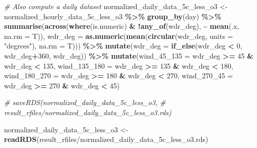 \documentclass[
]{article}
\newenvironment{Shaded}{\begin{snugshade}}{\end{snugshade}}
\newcommand{\AttributeTok}[1]{\textcolor[rgb]{0.13,0.29,0.53}{#1}}
\newcommand{\CommentTok}[1]{\textcolor[rgb]{0.56,0.35,0.01}{\textit{#1}}}
\newcommand{\DecValTok}[1]{\textcolor[rgb]{0.00,0.00,0.81}{#1}}
\newcommand{\FunctionTok}[1]{\textcolor[rgb]{0.13,0.29,0.53}{\textbf{#1}}}
\newcommand{\NormalTok}[1]{#1}
\newcommand{\OtherTok}[1]{\textcolor[rgb]{0.56,0.35,0.01}{#1}}
\newcommand{\SpecialCharTok}[1]{\textcolor[rgb]{0.81,0.36,0.00}{\textbf{#1}}}
\newcommand{\StringTok}[1]{\textcolor[rgb]{0.31,0.60,0.02}{#1}}
\begin{document}
\begin{Shaded}
\begin{Highlighting}[]
\CommentTok{\# Also compute a daily dataset}
\NormalTok{normalized\_daily\_data\_5c\_less\_o3 }\OtherTok{\textless{}{-}}\NormalTok{ normalized\_hourly\_data\_5c\_less\_o3 }\SpecialCharTok{\%\textgreater{}\%}
  \FunctionTok{group\_by}\NormalTok{(day) }\SpecialCharTok{\%\textgreater{}\%}
  \FunctionTok{summarise}\NormalTok{(}\FunctionTok{across}\NormalTok{(}\FunctionTok{where}\NormalTok{(is.numeric) }\SpecialCharTok{\&} \SpecialCharTok{!}\FunctionTok{any\_of}\NormalTok{(}\StringTok{\textquotesingle{}wdr\_deg\textquotesingle{}}\NormalTok{), }\SpecialCharTok{\textasciitilde{}} \FunctionTok{mean}\NormalTok{(.x, }\AttributeTok{na.rm =}\NormalTok{ T)),}
            \AttributeTok{wdr\_deg =} \FunctionTok{as.numeric}\NormalTok{(}\FunctionTok{mean}\NormalTok{(}\FunctionTok{circular}\NormalTok{(wdr\_deg, }\AttributeTok{units =} \StringTok{"degrees"}\NormalTok{), }\AttributeTok{na.rm =}\NormalTok{ T))) }\SpecialCharTok{\%\textgreater{}\%}
  \FunctionTok{mutate}\NormalTok{(}\AttributeTok{wdr\_deg =} \FunctionTok{if\_else}\NormalTok{(wdr\_deg }\SpecialCharTok{\textless{}} \DecValTok{0}\NormalTok{, wdr\_deg}\SpecialCharTok{+}\DecValTok{360}\NormalTok{, wdr\_deg)) }\SpecialCharTok{\%\textgreater{}\%}
  \FunctionTok{mutate}\NormalTok{(}\AttributeTok{wind\_45\_135 =}\NormalTok{ wdr\_deg }\SpecialCharTok{\textgreater{}=} \DecValTok{45} \SpecialCharTok{\&}\NormalTok{ wdr\_deg }\SpecialCharTok{\textless{}} \DecValTok{135}\NormalTok{,}
         \AttributeTok{wind\_135\_180 =}\NormalTok{ wdr\_deg }\SpecialCharTok{\textgreater{}=} \DecValTok{135} \SpecialCharTok{\&}\NormalTok{ wdr\_deg }\SpecialCharTok{\textless{}} \DecValTok{180}\NormalTok{,}
         \AttributeTok{wind\_180\_270 =}\NormalTok{ wdr\_deg }\SpecialCharTok{\textgreater{}=} \DecValTok{180} \SpecialCharTok{\&}\NormalTok{ wdr\_deg }\SpecialCharTok{\textless{}} \DecValTok{270}\NormalTok{,}
         \AttributeTok{wind\_270\_45 =}\NormalTok{ wdr\_deg }\SpecialCharTok{\textgreater{}=} \DecValTok{270} \SpecialCharTok{\&}\NormalTok{ wdr\_deg }\SpecialCharTok{\textless{}} \DecValTok{45}\NormalTok{)}

\CommentTok{\# saveRDS(normalized\_daily\_data\_5c\_less\_o3, }
\CommentTok{\#  \textquotesingle{}result\_rfiles/normalized\_daily\_data\_5c\_less\_o3.rds\textquotesingle{})}

\NormalTok{normalized\_daily\_data\_5c\_less\_o3 }\OtherTok{\textless{}{-}} 
  \FunctionTok{readRDS}\NormalTok{(}\StringTok{\textquotesingle{}result\_rfiles/normalized\_daily\_data\_5c\_less\_o3.rds\textquotesingle{}}\NormalTok{)}
\end{Highlighting}
\end{Shaded}
\end{document}
